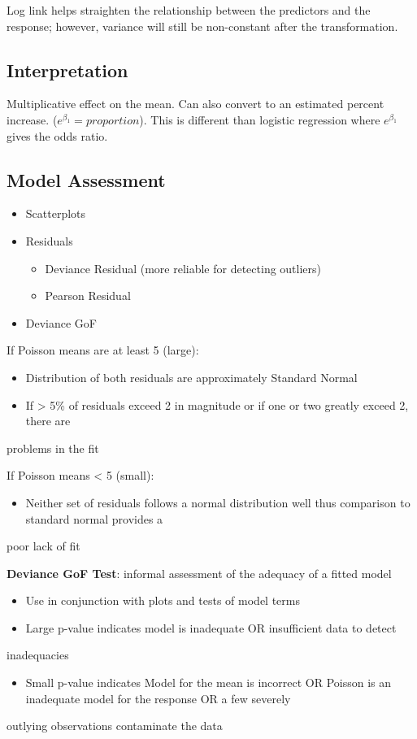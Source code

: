 \documentclass[11pt]{article}
\begin{document}
Log link helps straighten the relationship between the predictors and
the response; however, variance will still be non-constant after the
transformation.

\subsection{Interpretation}
\label{sec:org54393dd}
Multiplicative effect on the mean. Can also convert to an estimated
percent increase. (\(e^{\beta_1} = proportion\)). This is different than
logistic regression where \(e^{\beta_1}\) gives the odds ratio.

\subsection{Model Assessment}
\label{sec:orgaa9e3bb}
\begin{itemize}
\item Scatterplots
\item Residuals

\begin{itemize}
\item Deviance Residual (more reliable for detecting outliers)
\item Pearson Residual
\end{itemize}

\item Deviance GoF
\end{itemize}

If Poisson means are at least 5 (large):
\begin{itemize}
\item Distribution of both residuals are approximately Standard Normal
\item If > 5\% of residuals exceed 2 in magnitude or if one or two greatly exceed 2, there are
\end{itemize}
problems in the fit

If Poisson means < 5 (small):
\begin{itemize}
\item Neither set of residuals follows a normal distribution well thus comparison to standard normal provides a
\end{itemize}
poor lack of fit

\textbf{Deviance GoF Test}: informal assessment of the adequacy of a fitted
model
\begin{itemize}
\item Use in conjunction with plots and tests of model terms
\item Large p-value indicates model is inadequate OR insufficient data to detect
\end{itemize}
inadequacies
\begin{itemize}
\item Small p-value indicates Model for the mean is incorrect OR Poisson is an inadequate model for the response OR a few severely
\end{itemize}
outlying observations contaminate the data
\end{document}
